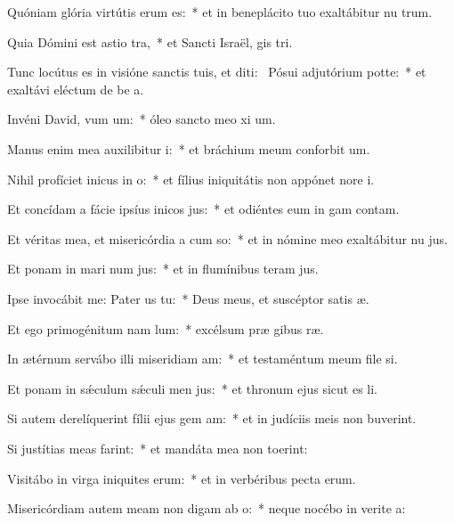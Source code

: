 \item Quóniam glória virtútis erum  es:~* et in beneplácito tuo exaltábitur nu trum.
\item Quia Dómini est astio tra,~* et Sancti Israël, gis tri.
\item Tunc locútus es in visióne sanctis tuis, et diti:~\pscross{} Pósui adjutórium  potte:~* et exaltávi eléctum de be a.
\item Invéni David, vum um:~* óleo sancto meo xi um.
\item Manus enim mea auxilibitur i:~* et bráchium meum conforbit um.
\item Nihil profíciet inicus in o:~* et fílius iniquitátis non appónet nore i.
\item Et concídam a fácie ipsíus inicos jus:~* et odiéntes eum in gam contam.
\item Et véritas mea, et misericórdia a cum so:~* et in nómine meo exaltábitur nu jus.
\item Et ponam in mari num jus:~* et in flumínibus teram jus.
\item Ipse invocábit me: Pater us  tu:~* Deus meus, et suscéptor satis æ.
\item Et ego primogénitum nam lum:~* excélsum præ gibus ræ.
\item In ætérnum servábo illi miseridiam am:~* et testaméntum meum file si.
\item Et ponam in sǽculum sǽculi men jus:~* et thronum ejus sicut es li.
\item Si autem derelíquerint fílii ejus gem am:~* et in judíciis meis non buverint.
\item Si justítias meas farint:~* et mandáta mea non toerint:
\item Visitábo in virga iniquites erum:~* et in verbéribus pecta erum.
\item Misericórdiam autem meam non digam ab o:~* neque nocébo in verite a:
